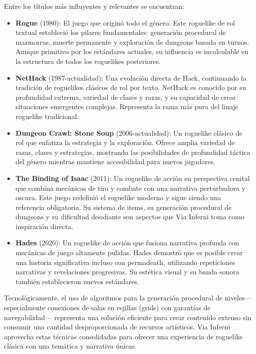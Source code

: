 Entre los títulos más influyentes y relevantes se encuentran:

\begin{itemize}
    \item \textbf{Rogue} (1980): El juego que originó todo el género.
Este roguelike de rol textual estableció los pilares fundamentales:
generación procedural de mazmorras, muerte permanente
y exploración de dungeons basada en turnos.
Aunque primitivo por los estándares actuales, su influencia es incalculable
en la estructura de todos los roguelikes posteriores.
    
    \item \textbf{NetHack} (1987-actualidad): Una evolución directa de Hack,
continuando la tradición de roguelikes clásicos de rol por texto.
NetHack es conocido por su profundidad extrema, variedad de clases y razas,
y su capacidad de crear situaciones emergentes complejas.
Representa la rama más pura del linaje roguelike tradicional.
    
    \item \textbf{Dungeon Crawl: Stone Soup} (2006-actualidad): Un roguelike clásico de rol
que enfatiza la estrategia y la exploración.
Ofrece amplia variedad de razas, clases y estrategias,
mostrando las posibilidades de profundidad táctica del género
mientras mantiene accesibilidad para nuevos jugadores.
    
    \item \textbf{The Binding of Isaac} (2011): Un roguelike de acción en perspectiva cenital
que combina mecánicas de tiro y combate con una narrativa perturbadora y oscura.
Este juego redefinió el roguelike moderno y sigue siendo una referencia obligatoria.
Su sistema de items, su generación procedural de dungeons
y su dificultad desafiante son aspectos que Via Inferni toma como inspiración directa.
    
    \item \textbf{Hades} (2020): Un roguelike de acción que fusiona narrativa profunda
con mecánicas de juego altamente pulidas.
Hades demostró que es posible crear una historia significativa incluso con permadeath,
utilizando repeticiones narrativas y revelaciones progresivas.
Su estética visual y su banda sonora también establecieron nuevos estándares.
\end{itemize}

Tecnológicamente, el uso de algoritmos para la generación procedural de niveles—
especialmente conexiones de salas en rejillas (grids) con garantías de navegabilidad—
representa una solución eficiente para crear contenido extenso
sin consumir una cantidad desproporcionada de recursos artísticos.
Via Inferni aprovecha estas técnicas consolidadas
para ofrecer una experiencia de roguelike clásica con una temática y narrativa únicas.

